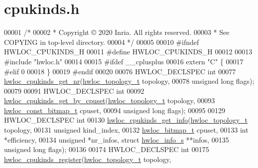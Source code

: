 \hypertarget{a00137_source}{}\section{cpukinds.\+h}
\label{a00137_source}

\begin{DoxyCode}
00001 \textcolor{comment}{/*}
00002 \textcolor{comment}{ * Copyright © 2020 Inria.  All rights reserved.}
00003 \textcolor{comment}{ * See COPYING in top-level directory.}
00004 \textcolor{comment}{ */}
00005 
00010 \textcolor{preprocessor}{#ifndef HWLOC\_CPUKINDS\_H}
00011 \textcolor{preprocessor}{#define HWLOC\_CPUKINDS\_H}
00012 
00013 \textcolor{preprocessor}{#include "hwloc.h"}
00014 
00015 \textcolor{preprocessor}{#ifdef \_\_cplusplus}
00016 \textcolor{keyword}{extern} \textcolor{stringliteral}{"C"} \{
00017 \textcolor{preprocessor}{#elif 0}
00018 \}
00019 \textcolor{preprocessor}{#endif}
00020 
00076 HWLOC\_DECLSPEC \textcolor{keywordtype}{int}
00077 \hyperlink{a00213_ga7553f7c6d3920b169f3fc18dfe6a33e3}{hwloc\_cpukinds\_get\_nr}(\hyperlink{a00186_ga9d1e76ee15a7dee158b786c30b6a6e38}{hwloc\_topology\_t} topology,
00078                       \textcolor{keywordtype}{unsigned} \textcolor{keywordtype}{long} flags);
00079 
00091 HWLOC\_DECLSPEC \textcolor{keywordtype}{int}
00092 \hyperlink{a00213_gaf979833aab18d2e7f4b17c932cbcf5d8}{hwloc\_cpukinds\_get\_by\_cpuset}(\hyperlink{a00186_ga9d1e76ee15a7dee158b786c30b6a6e38}{hwloc\_topology\_t} topology,
00093                              \hyperlink{a00205_gae991a108af01d408be2776c5b2c467b2}{hwloc\_const\_bitmap\_t} cpuset,
00094                              \textcolor{keywordtype}{unsigned} \textcolor{keywordtype}{long} flags);
00095 
00129 HWLOC\_DECLSPEC \textcolor{keywordtype}{int}
00130 \hyperlink{a00213_gae1b38fbe9c645583fc16052ce6fbb275}{hwloc\_cpukinds\_get\_info}(\hyperlink{a00186_ga9d1e76ee15a7dee158b786c30b6a6e38}{hwloc\_topology\_t} topology,
00131                         \textcolor{keywordtype}{unsigned} kind\_index,
00132                         \hyperlink{a00205_gaa3c2bf4c776d603dcebbb61b0c923d84}{hwloc\_bitmap\_t} cpuset,
00133                         \textcolor{keywordtype}{int} *efficiency,
00134                         \textcolor{keywordtype}{unsigned} *nr\_infos, \textcolor{keyword}{struct} \hyperlink{a00286}{hwloc\_info\_s} **infos,
00135                         \textcolor{keywordtype}{unsigned} \textcolor{keywordtype}{long} flags);
00136 
00174 HWLOC\_DECLSPEC \textcolor{keywordtype}{int}
00175 \hyperlink{a00213_ga6164ba92cfd06f530ec2c4a18a0dd5a9}{hwloc\_cpukinds\_register}(\hyperlink{a00186_ga9d1e76ee15a7dee158b786c30b6a6e38}{hwloc\_topology\_t} topology,

\end{DoxyCode}
